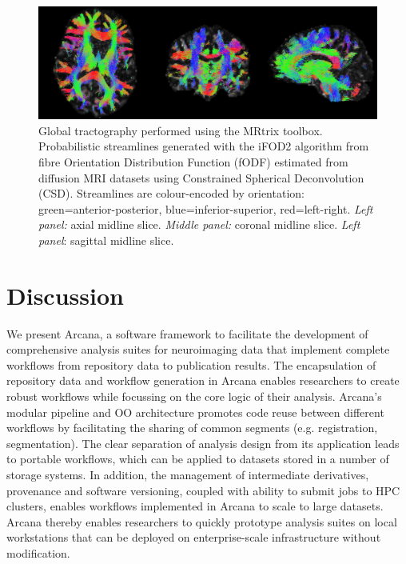 \begin{figure}
  \begin{center}
    \includegraphics[width=\textwidth]{figures/tractography}
  \caption{Global tractography performed using the MRtrix
toolbox. Probabilistic streamlines generated with the iFOD2 algorithm
from fibre Orientation Distribution Function (fODF) estimated from
diffusion MRI datasets using Constrained Spherical Deconvolution (CSD).
Streamlines are colour-encoded by orientation: green=anterior-posterior,
blue=inferior-superior, red=left-right. \emph{Left panel:} axial midline
slice. \emph{Middle panel:} coronal midline slice. \emph{Left panel}:
sagittal midline slice.}
  \end{center}
\label{fig:tractography}
\end{figure}

\section{Discussion}
\label{discussion}

We present Arcana, a software framework to facilitate the development of
comprehensive analysis suites for neuroimaging data that implement
complete workflows from repository data to publication results. The
encapsulation of repository data and workflow generation in Arcana
enables researchers to create robust workflows while focussing on the
core logic of their analysis. Arcana's modular pipeline and OO
architecture promotes code reuse between different workflows by
facilitating the sharing of common segments (e.g. registration,
segmentation). The clear separation of analysis design from its
application leads to portable workflows, which can be applied to
datasets stored in a number of storage systems. In addition, the
management of intermediate derivatives, provenance and software
versioning, coupled with ability to submit jobs to HPC clusters, enables
workflows implemented in Arcana to scale to large datasets. Arcana
thereby enables researchers to quickly prototype analysis suites on
local workstations that can be deployed on enterprise-scale
infrastructure without modification.

